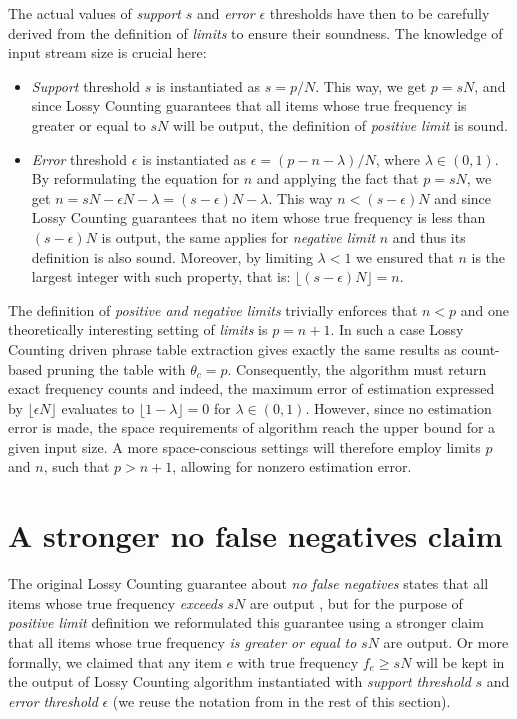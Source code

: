The actual values of \emph{support} $s$ and \emph{error} $\epsilon$ thresholds have then
to be carefully derived from the definition of \emph{limits} to ensure their soundness.
The knowledge of input stream size is crucial here:
\begin{itemize}
  \item \emph{Support} threshold $s$ is instantiated as $s = p / N$.
    This way, we get $p = sN$, and since Lossy Counting guarantees that all items whose
    true frequency is greater or equal to $sN$ will be output, the definition of
    \emph{positive limit} is sound.
  \item \emph{Error} threshold $\epsilon$ is instantiated as $\epsilon = (p - n - \lambda) / N$,
    where $\lambda \in (0,1)$.
    By reformulating the equation for $n$ and applying the fact that $p = sN$,
    we get $n = sN - \epsilon N - \lambda = (s - \epsilon)N - \lambda$.
    This way $n < (s - \epsilon)N$ and since Lossy Counting guarantees that no item whose
    true frequency is less than $(s - \epsilon)N$ is output, the same applies for
    \emph{negative limit} $n$ and thus its definition is also sound.
    Moreover, by limiting $\lambda < 1$ we ensured that $n$ is the largest integer with such
    property, that is: $\lfloor (s - \epsilon)N \rfloor = n$.
\end{itemize}

The definition of \emph{positive and negative limits} trivially enforces that $n < p$ and
one theoretically interesting setting of \emph{limits} is $p = n + 1$.
In such a case Lossy Counting driven phrase table extraction gives exactly the same results
as count-based pruning the table with $\theta_{c} = p$.
Consequently, the algorithm must return exact frequency counts and indeed,
the maximum error of estimation expressed by $\lfloor \epsilon N\rfloor $ evaluates to
$\lfloor 1 - \lambda \rfloor = 0$ for $\lambda \in (0,1)$.
However, since no estimation error is made, the space requirements of algorithm
reach the upper bound for a given input size.
A more space-conscious settings will therefore employ limits $p$ and $n$,
such that $p > n + 1$, allowing for nonzero estimation error.

\section{A stronger no false negatives claim}
\label{sec:positive-limit-validity}

The original Lossy Counting guarantee about \emph{no false negatives} states that all items
whose true frequency \emph{exceeds} $sN$ are output \citep[p. 3]{manku:lossycounting}, but
for the purpose of \emph{positive limit} definition we reformulated this guarantee using
a stronger claim that all items whose true frequency \emph{is greater or equal to} $sN$ are
output. Or more formally, we claimed that any item $e$ with true frequency $f_{e} \geq sN$
will be kept in the output of Lossy Counting algorithm instantiated with
\emph{support threshold} $s$ and \emph{error threshold} $\epsilon$
(we reuse the notation from  in the rest of this section).

